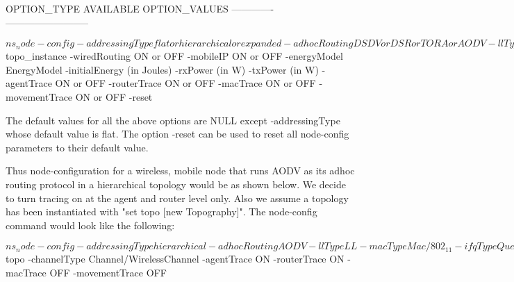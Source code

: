 \begin{program}

                   OPTION_TYPE    AVAILABLE OPTION_VALUES
                  -------------   --------------------------

 $ns_ node-config -addressingType flat or hierarchical or expanded
                  -adhocRouting   DSDV or DSR or TORA or AODV
                  -llType         LL
                  -macType        Mac/802_11
                  -propType       Propagation/TwoRayGround
                  -ifqType        Queue/DropTail/PriQueue
                  -ifqLen         50
                  -phyType        Phy/WirelessPhy
                  -antType        Antenna/OmniAntenna
                  -channelType    Channel/WirelessChannel
                  -topoInstance   $topo_instance
                  -wiredRouting   ON or OFF
                  -mobileIP       ON or OFF
                  -energyModel    EnergyModel
                  -initialEnergy  (in Joules)
                  -rxPower        (in W)
                  -txPower        (in W)
                  -agentTrace     ON or OFF
                  -routerTrace    ON or OFF
                  -macTrace       ON or OFF
                  -movementTrace  ON or OFF
                  -reset

\end{program}

The default values for all the above options are NULL except -addressingType
whose default value is flat. The option -reset can be used to reset all
node-config parameters to their default value.

Thus node-configuration for a wireless, mobile node that runs AODV as its
adhoc routing protocol in a hierarchical topology would be as shown below.
We decide to turn tracing on at the agent and router level only. Also we 
assume a topology has been instantiated with "set topo [new Topography]". 
The node-config command would look like the following:

\begin{program}
  $ns_ node-config -addressingType hierarchical
                   -adhocRouting AODV
                   -llType LL
                   -macType Mac/802_11
                   -ifqType Queue/DropTail/PriQueue
                   -ifqLen 50
                   -antType Antenna/OmniAntenna
                   -propType Propagation/TwoRayGround
                   -phyType Phy/WirelessPhy
                   -topoInstance $topo
                   -channelType Channel/WirelessChannel
                   -agentTrace ON
                   -routerTrace ON
                   -macTrace OFF
                   -movementTrace OFF
\end{program}

